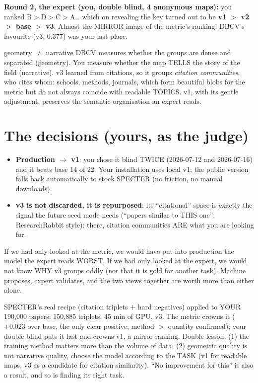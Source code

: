 \documentclass[11pt,a4paper]{article}
\begin{document}
\textbf{Round 2, the expert (you, double blind, 4 anonymous maps):} you ranked
B$>$D$>$C$>$A\ldots{} which on revealing the key turned out to be \textbf{v1 $>$ v2 $>$ base $>$
v3}. Almost the MIRROR image of the metric's ranking! DBCV's favourite (v3, 0.377) was your last
place.

\begin{concepto}{geometry $\neq$ narrative}
DBCV measures whether the groups are dense and separated (geometry). You measure whether the map
TELLS the story of the field (narrative). v3 learned from citations, so it groups
\emph{citation communities}, who cites whom: schools, methods, journals, which form beautiful
blobs for the metric but do not always coincide with readable TOPICS. v1, with its gentle
adjustment, preserves the semantic organisation an expert reads.
\end{concepto}

\section{The decisions (yours, as the judge)}

\begin{itemize}
  \item \textbf{Production $\to$ v1}: you chose it blind TWICE (2026-07-12 and 2026-07-16) and
        it beats base 14 of 22. Your installation uses local v1; the public version falls back
        automatically to stock SPECTER (no friction, no manual downloads).
  \item \textbf{v3 is not discarded, it is repurposed}: its ``citational'' space is exactly the
        signal the future seed mode needs (``papers similar to THIS one'', ResearchRabbit
        style): there, citation communities ARE what you are looking for.
\end{itemize}

\begin{ojo}
If we had only looked at the metric, we would have put into production the model the expert
reads WORST. If we had only looked at the expert, we would not know WHY v3 groups oddly (nor
that it is gold for another task). Machine proposes, expert validates, and the two views
together are worth more than either alone.
\end{ojo}

\begin{resumen}
SPECTER's real recipe (citation triplets $+$ hard negatives) applied to YOUR 190,000 papers:
150,885 triplets, 45 min of GPU, v3. The metric crowns it ($+0.023$ over base, the only clear
positive; method $>$ quantity confirmed); your double blind puts it last and crowns v1, a mirror
ranking. Double lesson: (1) the training method matters more than the volume of data; (2)
geometric quality is not narrative quality, choose the model according to the TASK (v1 for
readable maps, v3 as a candidate for citation similarity). ``No improvement for this'' is also a
result, and so is finding its right task.
\end{resumen}
\end{document}
